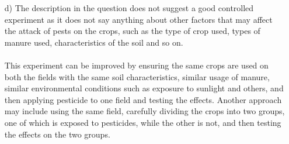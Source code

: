 \documentclass[a4paper]{article}
\begin{document}
\begin{enumerate}
\begin{figure}[H]
	\end{figure}
	\item[d)] The description in the question does not suggest a good controlled experiment as it does not say anything about other factors that may affect the attack of pests on the crops, such as the type of crop used, types of manure used, characteristics of the soil and so on.
	\paragraph{}This experiment can be improved by ensuring the same crops are used on both the fields with the same soil characteristics, similar usage of manure, similar environmental conditions such as exposure to sunlight and others, and then applying pesticide to one field and testing the effects. Another approach may include using the same field, carefully dividing the crops into two groups, one of which is exposed to pesticides, while the other is not, and then testing the effects on the two groups.
\end{enumerate}
\end{document}
